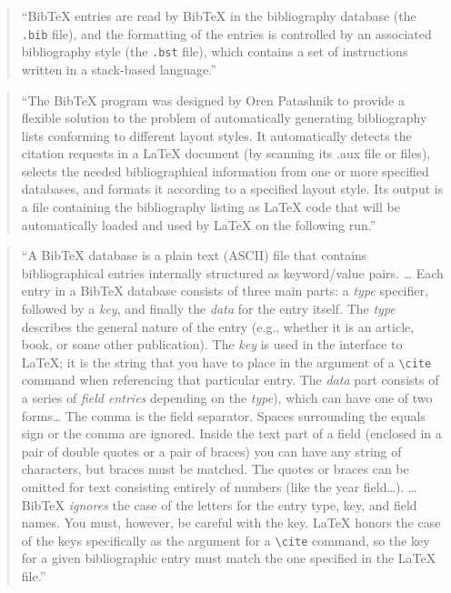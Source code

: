 \documentclass[]{tufte-book}
\begin{document}
\begin{quote}
``BibTeX entries are read by BibTeX in the bibliography database (the \texttt{.bib}
file), and the formatting of the entries is controlled by an associated
bibliography style (the \texttt{.bst} file), which contains a set of instructions
written in a stack-based language.'' \citep{mittelbach2004latex}
\end{quote}

\begin{quote}
``The BibTeX program was designed by Oren Patashnik to provide a flexible
solution to the problem of automatically generating bibliography lists conforming to different layout styles. It automatically detects the citation requests in
a LaTeX document (by scanning its .aux file or files), selects the needed
bibliographical information from one or more specified databases, and formats
it according to a specified layout style. Its output is a file containing
the bibliography listing as LaTeX code that will be automatically loaded and
used by LaTeX on the following run.'' \citep{mittelbach2004latex}
\end{quote}

\begin{quote}
``A BibTeX database is a plain text (ASCII) file that contains bibliographical
entries internally structured as keyword/value pairs. \ldots{} Each entry in a
BibTeX database consists of three main parts: a \emph{type} specifier, followed
by a \emph{key}, and finally the \emph{data} for the entry itself. The \emph{type} describes
the general nature of the entry (e.g., whether it is an article, book, or
some other publication). The \emph{key} is used in the interface to LaTeX; it
is the string that you have to place in the argument of a \texttt{\textbackslash{}cite} command when
referencing that particular entry. The \emph{data} part consists of a series of
\emph{field entries} depending on the \emph{type}), which can have one of two forms\ldots{}
The comma is the field separator. Spaces surrounding the equals sign or the
comma are ignored. Inside the text part of a field (enclosed in a pair of
double quotes or a pair of braces) you can have any string of characters,
but braces must be matched. The quotes or braces can be omitted for text
consisting entirely of numbers (like the year field\ldots). \ldots{} BibTeX \emph{ignores}
the case of the letters for the entry type, key, and field names. You must,
however, be careful with the key. LaTeX honors the case of the keys specifically
as the argument for a \texttt{\textbackslash{}cite} command, so the key for a given bibliographic
entry must match the one specified in the LaTeX file.'' \citep{mittelbach2004latex}
\end{quote}
\end{document}
